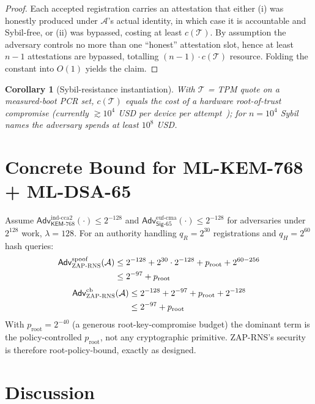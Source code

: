 \documentclass[11pt,a4paper]{article}
\newtheorem{corollary}[theorem]{Corollary}
\theoremstyle{definition}
\theoremstyle{remark}
\newcommand{\KEM}{\mathsf{KEM}}
\newcommand{\Sig}{\mathsf{Sig}}
\newcommand{\Adv}{\mathsf{Adv}}
\newcommand{\RNS}{\textsc{ZAP-RNS}}
\begin{document}
\begin{proof}
Each accepted registration carries an attestation that either
(i) was honestly produced under $\mathcal{A}$'s actual identity, in
which case it is accountable and Sybil-free, or (ii) was bypassed,
costing at least $c(\mathcal{T})$. By assumption the adversary controls
no more than one ``honest'' attestation slot, hence at least $n - 1$
attestations are bypassed, totalling $(n-1) \cdot c(\mathcal{T})$
resource. Folding the constant into $O(1)$ yields the claim.
\end{proof}

\begin{corollary}[Sybil-resistance instantiation]
With $\mathcal{T}$ = TPM quote on a measured-boot PCR set, $c(\mathcal{T})$
equals the cost of a hardware root-of-trust compromise (currently
$\gtrsim 10^4$ USD per device per attempt~\cite{rfc7401}); for $n=10^4$
Sybil names the adversary spends at least $10^8$ USD.
\end{corollary}

\section{Concrete Bound for ML-KEM-768 + ML-DSA-65}

Assume $\Adv^{\mathrm{ind\text{-}cca2}}_{\KEM\text{-}768}(\cdot) \le
2^{-128}$ and $\Adv^{\mathrm{euf\text{-}cma}}_{\Sig\text{-}65}(\cdot) \le
2^{-128}$ for adversaries under $2^{128}$ work, $\lambda = 128$.
For an authority handling $q_R = 2^{30}$ registrations and
$q_H = 2^{60}$ hash queries:
\begin{align*}
\Adv^{\mathrm{spoof}}_{\RNS}(\mathcal{A})
&\le 2^{-128} + 2^{30} \cdot 2^{-128} + p_{\mathrm{root}} + 2^{60-256} \\
&\le 2^{-97} + p_{\mathrm{root}}
\end{align*}
\begin{align*}
\Adv^{\mathrm{cb}}_{\RNS}(\mathcal{A})
&\le 2^{-128} + 2^{-97} + p_{\mathrm{root}} + 2^{-128} \\
&\le 2^{-97} + p_{\mathrm{root}}
\end{align*}
With $p_{\mathrm{root}} = 2^{-40}$ (a generous root-key-compromise
budget) the dominant term is the policy-controlled
$p_{\mathrm{root}}$, not any cryptographic primitive. \RNS{}'s
security is therefore root-policy-bound, exactly as designed.

\section{Discussion}
\end{document}
